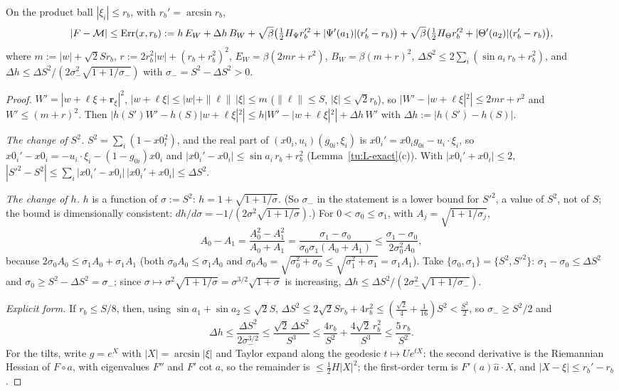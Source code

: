 \begin{lemma}\label{tu:L-taylor}
On the product ball $|\xi_i|\le r_b$, with $r_b'=\arcsin r_b$,
\[
|F-\mathcal M|\le{\rm Err}(x,r_b):=h\,E_W+\Delta h\,B_W+\sqrt\beta\big(\tfrac12H_\Psi r_b'^2+|\Psi'(a_1)|(r_b'-r_b)\big)
+\sqrt\beta\big(\tfrac12H_\Theta r_b'^2+|\Theta'(a_2)|(r_b'-r_b)\big),
\]
where $m:=|w|+\sqrt2Sr_b$, $r:=2r_b^2|w|+(r_b+r_b^2)^2$, $E_W=\beta(2mr+r^2)$, $B_W=\beta(m+r)^2$,
$\Delta S^2\le2\sum_i(\sin a_i\,r_b+r_b^2)$, and $\Delta h\le\Delta S^2/(2\sigma_-^2\sqrt{1+1/\sigma_-})$ with
$\sigma_-=S^2-\Delta S^2>0$.
\end{lemma}

\begin{proof}
$W'=|w+\ell\xi+\mathbf r_\xi|^2$, $|w+\ell\xi|\le|w|+\|\ell\|\,|\xi|\le m$ ($\|\ell\|\le S$, $|\xi|\le\sqrt2r_b$),
so $|W'-|w+\ell\xi|^2|\le2mr+r^2$ and $W'\le(m+r)^2$. Then
$|h(S')W'-h(S)|w+\ell\xi|^2|\le h|W'-|w+\ell\xi|^2|+\Delta h\,W'$ with $\Delta h:=|h(S')-h(S)|$.

\emph{The change of $S^2$.} $S^2=\sum_i(1-x0_i^2)$, and the real part of $(x0_i,u_i)(g_{0i},\xi_i)$ is
$x0_i'=x0_ig_{0i}-u_i\cdot\xi_i$, so $x0_i'-x0_i=-u_i\cdot\xi_i-(1-g_{0i})x0_i$ and $|x0_i'-x0_i|\le\sin a_i\,r_b+r_b^2$
(Lemma~\ref{tu:L-exact}(c)). With $|x0_i'+x0_i|\le2$, $|S'^2-S^2|\le\sum_i|x0_i'-x0_i|\,|x0_i'+x0_i|\le\Delta S^2$.

\emph{The change of $h$.} $h$ is a function of $\sigma:=S^2$: $h=1+\sqrt{1+1/\sigma}$. (So $\sigma_-$ in the statement is a
lower bound for $S'^2$, a value of $S^2$, not of $S$; the bound is dimensionally consistent: $dh/d\sigma=-1/(2\sigma^2\sqrt{1+1/\sigma})$.)
For $0<\sigma_0\le\sigma_1$, with $A_j=\sqrt{1+1/\sigma_j}$,
\[
A_0-A_1=\frac{A_0^2-A_1^2}{A_0+A_1}=\frac{\sigma_1-\sigma_0}{\sigma_0\sigma_1(A_0+A_1)}\le\frac{\sigma_1-\sigma_0}{2\sigma_0^2A_0},
\]
because $2\sigma_0A_0\le\sigma_1A_0+\sigma_1A_1$ (both $\sigma_0A_0\le\sigma_1A_0$ and $\sigma_0A_0=\sqrt{\sigma_0^2+\sigma_0}\le\sqrt{\sigma_1^2+\sigma_1}=\sigma_1A_1$).
Take $\{\sigma_0,\sigma_1\}=\{S^2,S'^2\}$: $\sigma_1-\sigma_0\le\Delta S^2$ and $\sigma_0\ge S^2-\Delta S^2=\sigma_-$; since
$\sigma\mapsto\sigma^2\sqrt{1+1/\sigma}=\sigma^{3/2}\sqrt{1+\sigma}$ is increasing, $\Delta h\le\Delta S^2/(2\sigma_-^2\sqrt{1+1/\sigma_-})$.

\emph{Explicit form.} If $r_b\le S/8$, then, using $\sin a_1+\sin a_2\le\sqrt2S$,
$\Delta S^2\le2\sqrt2Sr_b+4r_b^2\le(\frac{\sqrt2}4+\frac1{16})S^2<\frac{S^2}2$, so $\sigma_-\ge S^2/2$ and
\begin{equation}\label{tu:L-dh-explicit}
\Delta h\le\frac{\Delta S^2}{2\sigma_-^{3/2}}\le\frac{\sqrt2\,\Delta S^2}{S^3}\le\frac{4r_b}{S^2}+\frac{4\sqrt2\,r_b^2}{S^3}\le\frac{5\,r_b}{S^2}.
\end{equation} For the tilts, write $g=e^X$ with $|X|=\arcsin|\xi|$ and Taylor expand along the
geodesic $t\mapsto Ue^{tX}$: the second derivative is the Riemannian Hessian of $F\circ a$, with eigenvalues
$F''$ and $F'\cot a$, so the remainder is $\le\frac12H|X|^2$; the first-order term is $F'(a)\hat u\cdot X$, and
$|X-\xi|\le r_b'-r_b$.
\end{proof}

